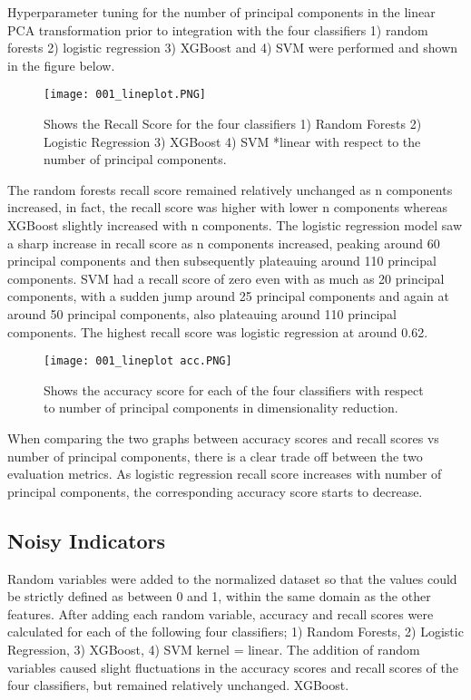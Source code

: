 \documentclass{article}
\begin{document}
\begin{itemize}
Hyperparameter tuning for the number of principal components in the linear PCA transformation prior to integration with the four classifiers 1) random forests 2) logistic regression 3) XGBoost and 4) SVM were performed and shown in the figure below. \newline

\begin{figure}[hbt!]
\texttt{[image: 001\_lineplot.PNG]}
\caption{Shows the Recall Score for the four classifiers 1) Random Forests 2) Logistic Regression 3) XGBoost 4) SVM *linear with respect to the number of principal components.}
\end{figure}
\newline
\newline
The random forests recall score remained relatively unchanged as n components increased, in fact, the recall score was higher with lower n components whereas XGBoost slightly increased with n components. The logistic regression model saw a sharp increase in recall score as n components increased, peaking around 60 principal components and then subsequently plateauing around 110 principal components. SVM had a recall score of zero even with as much as 20 principal components, with a sudden jump around 25 principal components and again at around 50 principal components, also plateauing around 110 principal components. The highest recall score was logistic regression at around 0.62.\newline


\begin{figure}[hbt!]
\texttt{[image: 001\_lineplot acc.PNG]}
\caption{Shows the accuracy score for each of the four classifiers with respect to number of principal components in dimensionality reduction.}
\end{figure}
\newline
\newline

When comparing the two graphs between accuracy scores and recall scores vs number of principal components, there is a clear trade off between the two evaluation metrics. As logistic regression recall score increases with number of principal components, the corresponding accuracy score starts to decrease. 

\subsection{Noisy Indicators}

Random variables were added to the normalized dataset so that the values could be strictly defined as between 0 and 1, within the same domain as the other features. After adding each random variable, accuracy and recall scores were calculated for each of the following four classifiers; 1) Random Forests, 2) Logistic Regression, 3) XGBoost, 4) SVM kernel = linear. The addition of random variables caused slight fluctuations in the  accuracy scores and recall scores of the four classifiers, but remained relatively unchanged. XGBoost.




\end{itemize}
\end{document}
